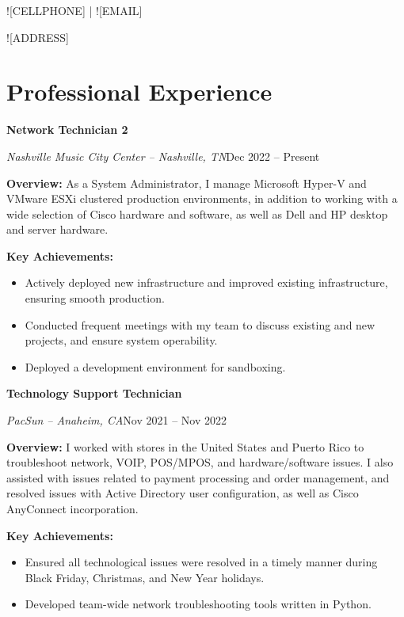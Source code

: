 \documentclass[a4paper]{article}
\renewcommand{\maketitle}{
    \begin{center}
        \color{white}
        {\huge\bfseries\theauthor}
        \vspace{.5em}

        \textsf{\faIcon{phone} ![CELLPHONE] | \faIcon{envelope} ![EMAIL]}\par
        \textsf{![ADDRESS]}

    \end{center}
}
\begin{document}
%

\author{\textsf{![FIRSTNAME] ![LASTNAME]}}
\maketitle

\section{Professional Experience}
\begin{minipage}{\textwidth}
\textbf{Network Technician 2}\par
\textit{Nashville Music City Center -- Nashville, TN}\hfill Dec 2022 -- Present

\medskip
\textbf{Overview:} As a System Administrator, I manage Microsoft Hyper-V and VMware ESXi clustered production environments, in addition to working with a wide selection of Cisco hardware and software, as well as Dell and HP desktop and server hardware.

\medskip
\textbf{Key Achievements:} 
\begin{itemize}
    \item Actively deployed new infrastructure and improved existing infrastructure, ensuring smooth production.
    \item Conducted frequent meetings with my team to discuss existing and new projects, and ensure system operability.
    \item Deployed a development environment for sandboxing.
\end{itemize}
\end{minipage}

\vspace{10pt}
\begin{minipage}{\textwidth}
\textbf{Technology Support Technician}\par
\textit{PacSun -- Anaheim, CA}\hfill Nov 2021 -- Nov 2022

\medskip
\textbf{Overview:} I worked with stores in the United States and Puerto Rico to troubleshoot network, VOIP, POS/MPOS, and hardware/software issues. I also assisted with issues related to payment processing and order management, and resolved issues with Active Directory user configuration, as well as Cisco AnyConnect incorporation.

\medskip
\textbf{Key Achievements:}
\begin{itemize}
    \item Ensured all technological issues were resolved in a timely manner during Black Friday, Christmas, and New Year holidays.
    \item Developed team-wide network troubleshooting tools written in Python.
\end{itemize}
\end{minipage}
\end{document}
